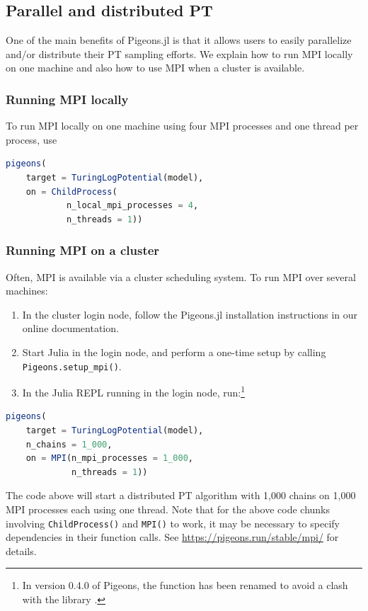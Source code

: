 \subsection{Parallel and distributed PT}
One of the main benefits of Pigeons.jl is that it allows users to easily parallelize 
and/or distribute their PT sampling efforts. We explain how to run MPI locally on 
one machine and also how to use MPI when a cluster is available.

\subsubsection{Running MPI locally}
To run MPI locally on one machine using four MPI processes and one thread per process,
use
\begin{lstlisting}[language = Julia]
pigeons(
    target = TuringLogPotential(model), 
    on = ChildProcess(
            n_local_mpi_processes = 4,
            n_threads = 1))
\end{lstlisting}

\subsubsection{Running MPI on a cluster}
Often, MPI is available via a cluster scheduling system. To run MPI over 
several machines:
\begin{enumerate}
    \item In the cluster login node, follow the Pigeons.jl installation instructions
    in our online documentation. 
    \item Start Julia in the login node, and perform a one-time setup by 
    calling \texttt{Pigeons.setup\_mpi()}.
    \item In the Julia REPL running in the login node, run:\footnote{In 
    version 0.4.0 of Pigeons, the function  has been renamed  
    to avoid a clash with the library .}
\end{enumerate}
\begin{lstlisting}[language = Julia]
pigeons(
    target = TuringLogPotential(model), 
    n_chains = 1_000,
    on = MPI(n_mpi_processes = 1_000, 
             n_threads = 1))
\end{lstlisting}
The code above will start a distributed PT algorithm with 1,000 chains on 1,000 
MPI processes each using one thread.
Note that for the above code chunks involving \texttt{ChildProcess()} and 
\texttt{MPI()} to work, it may be necessary to specify dependencies in their 
function calls. See \url{https://pigeons.run/stable/mpi/} for details. 


